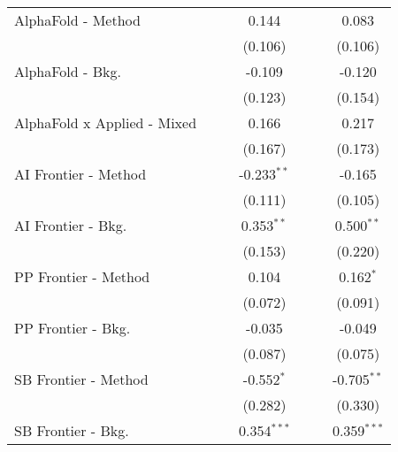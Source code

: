 \begin{tabular}{lcccccc}
   AlphaFold - Method             &         &              & 0.144          &         &               & 0.083\\   
                                  &         &              & (0.106)        &         &               & (0.106)\\   
   AlphaFold - Bkg.               &         &              & -0.109         &         &               & -0.120\\   
                                  &         &              & (0.123)        &         &               & (0.154)\\   
   AlphaFold x Applied - Mixed    &         &              & 0.166          &         &               & 0.217\\   
                                  &         &              & (0.167)        &         &               & (0.173)\\   
   AI Frontier - Method           &         &              & -0.233$^{**}$  &         &               & -0.165\\   
                                  &         &              & (0.111)        &         &               & (0.105)\\   
   AI Frontier - Bkg.             &         &              & 0.353$^{**}$   &         &               & 0.500$^{**}$\\   
                                  &         &              & (0.153)        &         &               & (0.220)\\   
   PP Frontier - Method           &         &              & 0.104          &         &               & 0.162$^{*}$\\   
                                  &         &              & (0.072)        &         &               & (0.091)\\   
   PP Frontier - Bkg.             &         &              & -0.035         &         &               & -0.049\\   
                                  &         &              & (0.087)        &         &               & (0.075)\\   
   SB Frontier - Method           &         &              & -0.552$^{*}$   &         &               & -0.705$^{**}$\\   
                                  &         &              & (0.282)        &         &               & (0.330)\\   
   SB Frontier - Bkg.             &         &              & 0.354$^{***}$  &         &               & 0.359$^{***}$\\   

\end{tabular}

